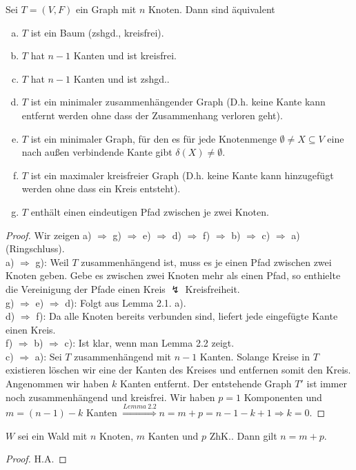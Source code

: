 \begin{satz}
	Sei $T=(V,F)$ ein Graph mit $n$ Knoten. Dann sind äquivalent
	\begin{enumerate}[a)]
		\item $T$ ist ein Baum (zshgd., kreisfrei).
		\item $T$ hat $n-1$ Kanten und ist kreisfrei.
		\item $T$ hat $n-1$ Kanten und ist zshgd..
		\item $T$ ist ein minimaler zusammenhängender Graph (D.h. keine Kante kann entfernt werden ohne dass der Zusammenhang verloren geht).
		\item $T$ ist ein minimaler Graph, für den es für jede Knotenmenge $\emptyset \neq X\subseteq V$ eine nach außen verbindende Kante gibt $\delta(X) \neq \emptyset$.
		\item $T$ ist ein maximaler kreisfreier Graph (D.h. keine Kante kann hinzugefügt werden ohne dass ein Kreis entsteht).
		\item $T$ enthält einen eindeutigen Pfad zwischen je zwei Knoten.
	\end{enumerate}
\end{satz}
\begin{proof}
	Wir zeigen a) $\Rightarrow$ g) $\Rightarrow$ e) $\Rightarrow$ d) $\Rightarrow$ f) $\Rightarrow$ b) $\Rightarrow$ c) $\Rightarrow$ a) (Ringschluss).\\
	a) $\Rightarrow$ g): Weil $T$ zusammenhängend ist, muss es je einen Pfad zwischen zwei Knoten geben. Gebe es zwischen zwei Knoten mehr als einen Pfad, so enthielte die Vereinigung der Pfade einen Kreis $\lightning$ Kreisfreiheit.\\
	g) $\Rightarrow$ e) $\Rightarrow$ d): Folgt aus Lemma 2.1. a).\\
	d) $\Rightarrow$ f): Da alle Knoten bereits verbunden sind, liefert jede eingefügte Kante einen Kreis.\\
	f) $\Rightarrow$ b) $\Rightarrow$ c): Ist klar, wenn man Lemma 2.2 zeigt.\\
	c) $\Rightarrow$ a): Sei $T$ zusammenhängend mit $n-1$ Kanten. Solange Kreise in $T$ existieren löschen wir eine der Kanten des Kreises und entfernen somit den Kreis. Angenommen wir haben $k$ Kanten entfernt. Der entstehende Graph $T'$ ist immer noch zusammenhängend und kreisfrei. Wir haben $p=1$ Komponenten und $m=(n-1)-k$ Kanten $\overset{Lemma~2.2}{\Rightarrow} n =m+p=n-1-k+1 \Rightarrow k=0$. 
\end{proof}
\begin{lemma}
	$W$ sei ein Wald mit $n$ Knoten, $m$ Kanten und $p$ ZhK.. Dann gilt $n=m+p$.
\end{lemma}
\begin{proof}
	H.A.
\end{proof}
